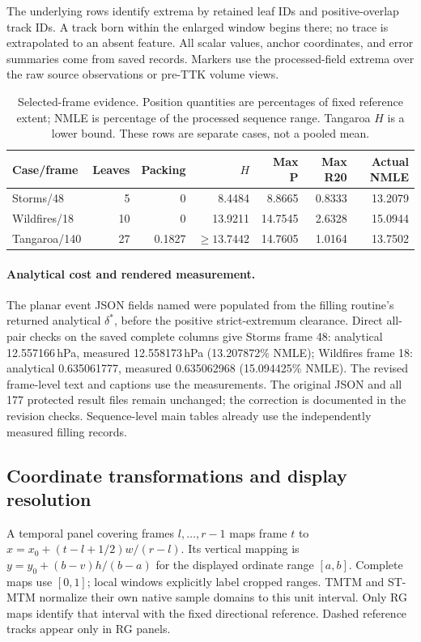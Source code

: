 The underlying rows identify extrema by retained leaf IDs and positive-overlap track IDs. A track born within the enlarged window begins there; no trace is extrapolated to an absent feature. All scalar values, anchor coordinates, and error summaries come from saved records. Markers use the processed-field extrema over the raw source observations or pre-TTK volume views.

\begin{table}[H]\centering\small
\caption{Selected-frame evidence. Position quantities are percentages of fixed reference extent; NMLE is percentage of the processed sequence range. Tangaroa $H$ is a lower bound. These rows are separate cases, not a pooled mean.}
\begin{tabular}{lrrrrrr}\toprule
Case/frame & Leaves & Packing & $H$ & Max P & Max R20 & Actual NMLE\\\midrule
Storms/48 & 5 & 0 & 8.4484 & 8.8665 & 0.8333 & 13.2079\\
Wildfires/18 & 10 & 0 & 13.9211 & 14.7545 & 2.6328 & 15.0944\\
Tangaroa/140 & 27 & 0.1827 & $\ge13.7442$ & 14.7605 & 1.0164 & 13.7502\\\bottomrule\end{tabular}
\end{table}

\paragraph{Analytical cost and rendered measurement.} The planar event JSON fields named  were populated from the filling routine's returned analytical $\delta^*$, before the positive strict-extremum clearance. Direct all-pair checks on the saved complete columns give Storms frame 48: analytical 12.557166\,hPa, measured 12.558173\,hPa (13.207872\% NMLE); Wildfires frame 18: analytical 0.635061777, measured 0.635062968 (15.094425\% NMLE). The revised frame-level text and captions use the measurements. The original JSON and all 177 protected result files remain unchanged; the correction is documented in the revision checks. Sequence-level main tables already use the independently measured filling records.

\subsection{Coordinate transformations and display resolution}
A temporal panel covering frames $l,\ldots,r-1$ maps frame $t$ to $x=x_0+(t-l+1/2)w/(r-l)$. Its vertical mapping is $y=y_0+(b-v)h/(b-a)$ for the displayed ordinate range $[a,b]$. Complete maps use $[0,1]$; local windows explicitly label cropped ranges. TMTM and ST-MTM normalize their own native sample domains to this unit interval. Only RG maps identify that interval with the fixed directional reference. Dashed reference tracks appear only in RG panels.

